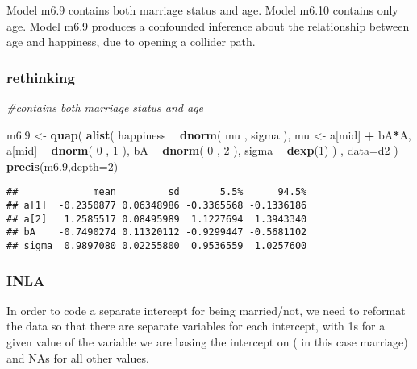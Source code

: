 \documentclass[
]{article}
\newenvironment{Shaded}{\begin{snugshade}}{\end{snugshade}}
\newcommand{\CommentTok}[1]{\textcolor[rgb]{0.56,0.35,0.01}{\textit{#1}}}
\newcommand{\DataTypeTok}[1]{\textcolor[rgb]{0.13,0.29,0.53}{#1}}
\newcommand{\DecValTok}[1]{\textcolor[rgb]{0.00,0.00,0.81}{#1}}
\newcommand{\FloatTok}[1]{\textcolor[rgb]{0.00,0.00,0.81}{#1}}
\newcommand{\KeywordTok}[1]{\textcolor[rgb]{0.13,0.29,0.53}{\textbf{#1}}}
\newcommand{\NormalTok}[1]{#1}
\newcommand{\OperatorTok}[1]{\textcolor[rgb]{0.81,0.36,0.00}{\textbf{#1}}}
\newcommand{\StringTok}[1]{\textcolor[rgb]{0.31,0.60,0.02}{#1}}
\begin{document}
Model m6.9 contains both marriage status and age. Model m6.10 contains
only age. Model m6.9 produces a confounded inference about the
relationship between age and happiness, due to opening a collider path.

\hypertarget{rethinking}{%
\subsubsection{rethinking}\label{rethinking}}

\begin{Shaded}
\begin{Highlighting}[]
\CommentTok{#contains both marriage status and age}

\NormalTok{m6}\FloatTok{.9}\NormalTok{ <-}\StringTok{ }\KeywordTok{quap}\NormalTok{(}
    \KeywordTok{alist}\NormalTok{(}
\NormalTok{        happiness }\OperatorTok{~}\StringTok{ }\KeywordTok{dnorm}\NormalTok{( mu , sigma ),}
\NormalTok{        mu <-}\StringTok{ }\NormalTok{a[mid] }\OperatorTok{+}\StringTok{ }\NormalTok{bA}\OperatorTok{*}\NormalTok{A,}
\NormalTok{        a[mid] }\OperatorTok{~}\StringTok{ }\KeywordTok{dnorm}\NormalTok{( }\DecValTok{0}\NormalTok{ , }\DecValTok{1}\NormalTok{ ),}
\NormalTok{        bA }\OperatorTok{~}\StringTok{ }\KeywordTok{dnorm}\NormalTok{( }\DecValTok{0}\NormalTok{ , }\DecValTok{2}\NormalTok{ ),}
\NormalTok{        sigma }\OperatorTok{~}\StringTok{ }\KeywordTok{dexp}\NormalTok{(}\DecValTok{1}\NormalTok{)}
\NormalTok{    ) , }\DataTypeTok{data=}\NormalTok{d2 )}
\KeywordTok{precis}\NormalTok{(m6}\FloatTok{.9}\NormalTok{,}\DataTypeTok{depth=}\DecValTok{2}\NormalTok{)}
\end{Highlighting}
\end{Shaded}

\begin{verbatim}
##             mean         sd       5.5%      94.5%
## a[1]  -0.2350877 0.06348986 -0.3365568 -0.1336186
## a[2]   1.2585517 0.08495989  1.1227694  1.3943340
## bA    -0.7490274 0.11320112 -0.9299447 -0.5681102
## sigma  0.9897080 0.02255800  0.9536559  1.0257600
\end{verbatim}

\hypertarget{inla}{%
\subsubsection{INLA}\label{inla}}

In order to code a separate intercept for being married/not, we need to
reformat the data so that there are separate variables for each
intercept, with 1s for a given value of the variable we are basing the
intercept on ( in this case marriage) and NAs for all other values.
\end{document}
